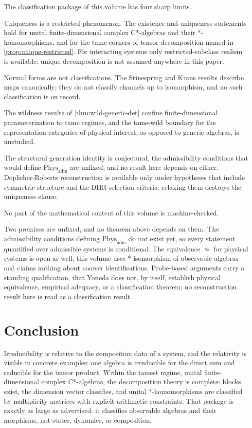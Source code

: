 \documentclass[11pt,letterpaper]{article}
\theoremstyle{definition}
\theoremstyle{remark}
\begin{document}
The classification package of this volume has four sharp limits.

Uniqueness is a restricted phenomenon. The existence-and-uniqueness statements hold for unital finite-dimensional complex C*-algebras and their *-homomorphisms, and for the tame corners of tensor decomposition named in \cref{prop:unique-restricted}. For interacting systems only restricted-subclass realism is available: unique decomposition is not assumed anywhere in this paper.

Normal forms are not classifications. The Stinespring and Kraus results describe maps canonically; they do not classify channels up to isomorphism, and no such classification is on record.

The wildness results of \cref{thm:wild-generic-det} confine finite-dimensional parameterization to tame regimes, and the tame-wild boundary for the representation categories of physical interest, as opposed to generic algebras, is unstudied.

The structural generation identity is conjectural, the admissibility conditions that would define $\mathrm{Phys}_{\mathrm{adm}}$ are unfixed, and no result here depends on either. Doplicher-Roberts reconstruction is available only under hypotheses that include symmetric structure and the DHR selection criteria; relaxing them destroys the uniqueness clause.

No part of the mathematical content of this volume is machine-checked.

Two premises are unfixed, and no theorem above depends on them. The admissibility conditions defining $\mathrm{Phys}_{\mathrm{adm}}$ do not exist yet, so every statement quantified over admissible systems is conditional. The equivalence $\simeq$ for physical systems is open as well; this volume uses *-isomorphism of observable algebras and claims nothing about coarser identifications. Probe-based arguments carry a standing qualification, that Yoneda does not, by itself, establish physical equivalence, empirical adequacy, or a classification theorem; no reconstruction result here is read as a classification result.

\section{Conclusion}

Irreducibility is relative to the composition data of a system, and the relativity is visible in concrete examples: one algebra is irreducible for the direct sum and reducible for the tensor product. Within the tamest regime, unital finite-dimensional complex C*-algebras, the decomposition theory is complete: blocks exist, the dimension vector classifies, and unital *-homomorphisms are classified by multiplicity matrices with explicit arithmetic constraints. That package is exactly as large as advertised: it classifies observable algebras and their morphisms, not states, dynamics, or composition.
\end{document}
